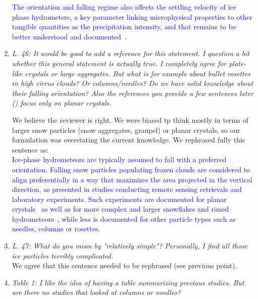 \documentclass[12pt]{article}
\newcommand*{\blue}{\textcolor{blue}}
\begin{document}
\begin{enumerate}
    \blue{The orientation and falling regime also affects the settling velocity of ice phase hydrometers, a key parameter linking microphysical properties to other tangible quantities as the precipitation intensity, and that remains to be better understood and documented~\cite{Heymsfield_JAS_2004}.}\\

    \item \textit{L. 46: It would be good to add a reference for this statement. I question a bit whether this general statement is actually true. I completely agree for plate-like crystals or large aggregates. But what is for example about bullet rosettes in high cirrus clouds? Or columns/needles? Do we have solid knowledge about their falling orientation? Also the references you provide a few sentences later (\cite{Noel_JAMC_2005,Tinklenberg_JFM_2023}) focus only on planar crystals.}

    We believe the reviewer is right. We were biased tp think mostly in terms of larger snow particles (snow aggregates, graupel) or planar crystals, so our formulation was overstating the current knowledge. We rephrased fully this sentence as:\\
    
    \blue{Ice-phase hydrometeors are typically assumed to fall with a preferred orientation. Falling snow particles populating frozen clouds are  considered to align preferentially in a way that maximizes the area projected in the vertical direction, as presented in studies conducting remote sensing retrievals and laboratory experiments.  Such experiments are documented for planar crystals~\cite{Noel_JAMC_2005,Matrosov_JAS_2005,Tinklenberg_JFM_2024} as well as for more complex and larger snowflakes and rimed hydrometeors~\cite{Kennedy_JAMC_2011, Ryzhkov_JAMC_2011, Koebschall_EF_2023}, while less is documented for other particle types such as needles, columns or rosettes. }\\


    \item \textit{L. 47: What do you mean by "relatively simple"? Personally, I find all those ice particles terribly complicated.}\\
    
    We agree that this sentence needed to be rephrased (see previous point).
    
    \item \textit{Table 1: I like the idea of having a table summarizing previous studies. But are there no studies that looked at columns or needles?}\\


\end{enumerate}
\end{document}
